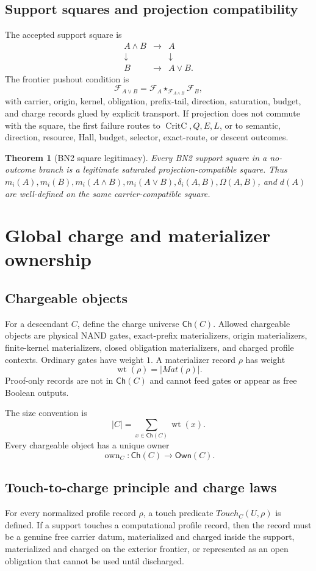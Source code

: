 \documentclass[10.5pt,a4paper]{article}
\newtheorem{theorem}{Theorem}[section]
\newcommand{\Ch}{\mathsf{Ch}}
\newcommand{\Front}{\mathcal F}
\newcommand{\wt}{\operatorname{wt}}
\newcommand{\own}{\operatorname{own}}
\newcommand{\CritC}{\operatorname{CritC}}
\begin{document}
\subsection{Support squares and projection compatibility}
The accepted support square is
\[
\begin{array}{ccc}
A\wedge B & \longrightarrow & A\\
\downarrow & & \downarrow\\
B & \longrightarrow & A\vee B.
\end{array}
\]
The frontier pushout condition is
\[
\Front_{A\vee B}=\Front_A\star_{\Front_{A\wedge B}}\Front_B,
\]
with carrier, origin, kernel, obligation, prefix-tail, direction, saturation, budget, and charge records glued by explicit transport. If projection does not commute with the square, the first failure routes to \(\CritC,Q,E,L\), or to semantic, direction, resource, Hall, budget, selector, exact-route, or descent outcomes.

\begin{theorem}[BN2 square legitimacy]
Every BN2 support square in a no-outcome branch is a legitimate saturated projection-compatible square. Thus \(m_i(A),m_i(B),m_i(A\wedge B),m_i(A\vee B),\delta_i(A,B),\Omega(A,B)\), and \(d(A)\) are well-defined on the same carrier-compatible square.
\end{theorem}

\section{Global charge and materializer ownership}

\subsection{Chargeable objects}
For a descendant \(C\), define the charge universe \(\Ch(C)\). Allowed chargeable objects are physical NAND gates, exact-prefix materializers, origin materializers, finite-kernel materializers, closed obligation materializers, and charged profile contexts. Ordinary gates have weight \(1\). A materializer record \(\rho\) has weight
\[
\wt(\rho)=|Mat(\rho)|.
\]
Proof-only records are not in \(\Ch(C)\) and cannot feed gates or appear as free Boolean outputs.

The size convention is
\[
|C|=\sum_{x\in\Ch(C)}\wt(x).
\]
Every chargeable object has a unique owner
\[
\own_C:\Ch(C)\to\mathsf{Own}(C).
\]

\subsection{Touch-to-charge principle and charge laws}
For every normalized profile record \(\rho\), a touch predicate \(Touch_C(U,\rho)\) is defined. If a support touches a computational profile record, then the record must be a genuine free carrier datum, materialized and charged inside the support, materialized and charged on the exterior frontier, or represented as an open obligation that cannot be used until discharged.
\end{document}
